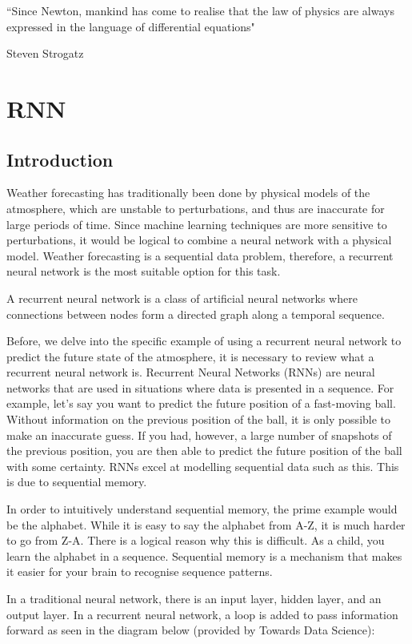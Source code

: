 \epigraph{``Since Newton, mankind has come to realise that the law of physics are always expressed in the language of differential equations"}{Steven Strogatz}

\section{RNN}
\subsection{Introduction}
Weather forecasting has traditionally been done by physical models of the atmosphere, which are unstable to perturbations, and thus are inaccurate for large periods of time\cite{why_rnn}. Since machine learning techniques are more sensitive to perturbations, it would be logical to combine a neural network with a physical model. Weather forecasting is a sequential data problem, therefore, a recurrent neural network is the most suitable option for this task. 

\begin{definition}
A recurrent neural network is a class of artificial neural networks where connections between nodes form a directed graph along a temporal sequence.
\end{definition}

Before, we delve into the specific example of using a recurrent neural network to predict the future state of the atmosphere, it is necessary to review what a recurrent neural network is. Recurrent Neural Networks (RNNs) are neural networks that are used in situations where data is presented in a sequence. For example, let's say you want to predict the future position of a fast-moving ball. Without information on the previous position of the ball, it is only possible to make an inaccurate guess. If you had, however, a large number of snapshots of the previous position, you are then able to predict the future position of the ball with some certainty. RNNs excel at modelling sequential data such as this. This is due to sequential memory.

In order to intuitively understand sequential memory, the prime example would be the alphabet. While it is easy to say the alphabet from A-Z, it is much harder to go from Z-A. There is a logical reason why this is difficult. As a child, you learn the alphabet in a sequence. Sequential memory is a mechanism that makes it easier for your brain to recognise sequence patterns.

In a traditional neural network, there is an input layer, hidden layer, and an output layer. In a recurrent neural network, a loop is added to pass information forward as seen in the diagram below (provided by Towards Data Science)\cite{intro_rnn}:

